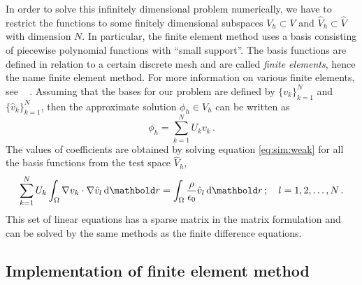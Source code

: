 In order to solve this infinitely dimensional problem numerically, we have to restrict the
functions to some finitely dimensional subspaces $V_h \subset V$ and $\hat V_h\subset\hat V$ with
dimension $N$. In particular, the finite element method uses a basis consisting of piecewise
polynomial functions with ``small support''. The basis functions are defined in relation
to a certain discrete mesh and are called {\em finite elements}, hence the name finite element
method. For more information on various finite elements, see \eg\ \citep{fenicsbook}
.
Assuming that the bases for our problem are defined by
 $\{v_k\}_{k=1}^N$ and $\{\hat v_k\}_{k=1}^N$, then the approximate
solution $\phi_h \in V_h$ can be written as
\begin{equation}
\phi_h = \sum_{k=1}^N U_k v_k\,.
\end{equation}
The values of coefficients are obtained by solving equation \eqref{eq:sim:weak} for all the
basis functions from the test space $\hat V_h$, \ie
\begin{equation}
\sum_{k=1}^N U_k\int_\Omega \nabla v_k\cdot\nabla \hat v_l\de\mb r =
 \int_\Omega\frac{\rho}{\epsilon_0} \hat v_l \de\mb r\,;\quad l=1,2,\ldots,N\,.
\end{equation}
This set of linear equations has a sparse matrix in the matrix formulation and can be solved
by the same methods as the finite difference equations.

\subsection{Implementation of finite element method}

